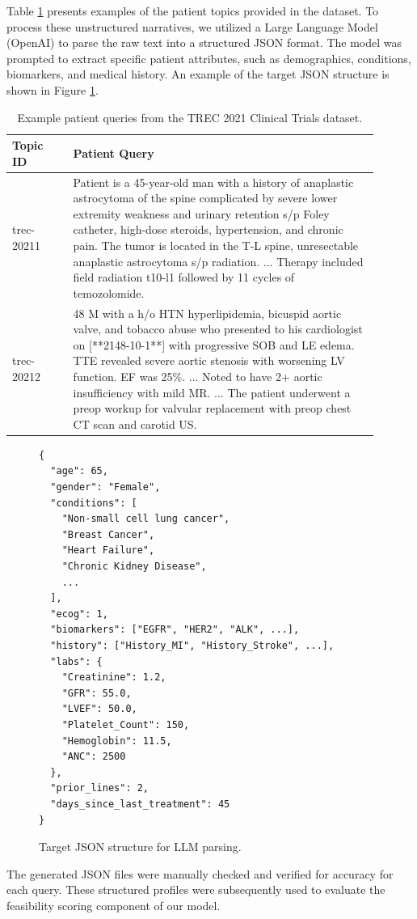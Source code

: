 \documentclass[11pt]{article}
\begin{document}
Table \ref{tab:example_queries} presents examples of the patient topics provided in the dataset. To process these unstructured narratives, we utilized a Large Language Model (OpenAI) to parse the raw text into a structured JSON format. The model was prompted to extract specific patient attributes, such as demographics, conditions, biomarkers, and medical history. An example of the target JSON structure is shown in Figure \ref{fig:json_structure}.

\begin{table}[h]
\centering
\small
\renewcommand{\arraystretch}{1.2}
\begin{tabular}{p{0.15\linewidth} p{0.75\linewidth}}
\hline
\textbf{Topic ID} & \textbf{Patient Query} \\
\hline
trec-20211 & Patient is a 45-year-old man with a history of anaplastic astrocytoma of the spine complicated by severe lower extremity weakness and urinary retention s/p Foley catheter, high-dose steroids, hypertension, and chronic pain. The tumor is located in the T-L spine, unresectable anaplastic astrocytoma s/p radiation. ... Therapy included field radiation t10-l1 followed by 11 cycles of temozolomide. \\
\hline
trec-20212 & 48 M with a h/o HTN hyperlipidemia, bicuspid aortic valve, and tobacco abuse who presented to his cardiologist on [**2148-10-1**] with progressive SOB and LE edema. TTE revealed severe aortic stenosis with worsening LV function. EF was 25\%. ... Noted to have 2+ aortic insufficiency with mild MR. ... The patient underwent a preop workup for valvular replacement with preop chest CT scan and carotid US. \\
\hline
\end{tabular}
\caption{Example patient queries from the TREC 2021 Clinical Trials dataset.}
\label{tab:example_queries}
\end{table}

\begin{figure}[h]
\centering
\scriptsize %
\begin{verbatim}
{
  "age": 65,
  "gender": "Female",
  "conditions": [
    "Non-small cell lung cancer",
    "Breast Cancer",
    "Heart Failure",
    "Chronic Kidney Disease",
    ...
  ],
  "ecog": 1,
  "biomarkers": ["EGFR", "HER2", "ALK", ...],
  "history": ["History_MI", "History_Stroke", ...],
  "labs": {
    "Creatinine": 1.2,
    "GFR": 55.0,
    "LVEF": 50.0,
    "Platelet_Count": 150,
    "Hemoglobin": 11.5,
    "ANC": 2500
  },
  "prior_lines": 2,
  "days_since_last_treatment": 45
}
\end{verbatim}
\vspace{-10pt}
\caption{Target JSON structure for LLM parsing.}
\label{fig:json_structure}
\end{figure}
The generated JSON files were manually checked and verified for accuracy for each query. These structured profiles were subsequently used to evaluate the feasibility scoring component of our model.
\end{document}
